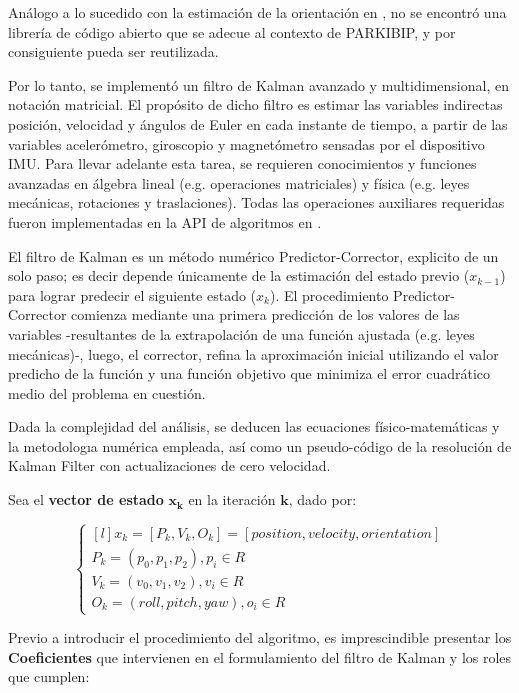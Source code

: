 Análogo a lo sucedido con la estimación de la orientación en , no se encontró una librería de código abierto que se adecue al contexto de PARKIBIP, y por consiguiente pueda ser reutilizada. 

Por lo tanto, se implementó un filtro de Kalman avanzado y multidimensional, en notación matricial. El propósito de dicho filtro es estimar las variables indirectas posición, velocidad y ángulos de Euler en cada instante de tiempo, a partir de las variables acelerómetro, giroscopio y magnetómetro sensadas por el dispositivo IMU. Para llevar adelante esta tarea, se requieren conocimientos y funciones avanzadas en álgebra lineal (e.g. operaciones matriciales) y física (e.g. leyes mecánicas, rotaciones y traslaciones). Todas las operaciones auxiliares requeridas fueron implementadas en la API de algoritmos en .

El filtro de Kalman es un método numérico Predictor-Corrector, explicito de un solo paso; es decir depende únicamente de la estimación del estado previo ($x_{k-1}$) para lograr predecir el siguiente estado ($x_{k}$). El procedimiento Predictor-Corrector comienza mediante una primera predicción de los valores de las variables -resultantes de la extrapolación de una función ajustada (e.g. leyes mecánicas)-, luego, el corrector, refina la aproximación inicial utilizando el valor predicho de la función y una función objetivo que minimiza el error cuadrático medio del problema en cuestión.

Dada la complejidad del análisis, se deducen las ecuaciones físico-matemáticas y la metodologıa numérica empleada, así como un pseudo-código de la resolución de Kalman Filter con actualizaciones de cero velocidad.

\noindent Sea el \textbf{vector de estado} $\boldsymbol{x_k}$ en la iteración $\boldsymbol{k}$, dado por:

\[\left\{ 
            \begin{matrix*}[l]
            x_{k} = [P_k,V_k,O_k] = [position, velocity, orientation]\\
            P_k = (p_0,p_1,p_2),  p_i \in R \\
            V_k = (v_0,v_1,v_2), v_i \in R \\
            O_k = (roll,pitch,yaw),  o_i \in R
            \end{matrix*}
\right. \]

\noindent Previo a introducir el procedimiento del algoritmo, es imprescindible presentar los \textbf{Coeficientes} que intervienen en el formulamiento del filtro de Kalman y los roles que cumplen:

